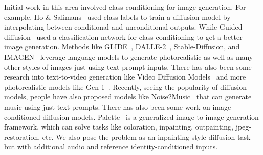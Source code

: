 Initial work in this area involved class conditioning for image generation. For example, Ho \& Salimans~\cite{ho2021classifierfree} used class labels to train a diffusion model by interpolating between conditional and unconditional outputs. While Guided-diffusion~\cite{guided-diffusion} used a classification network for class conditioning to get a better image generation. Methods like GLIDE~\cite{glide}, DALLE-2~\cite{dalle2}, Stable-Diffusion\cite{latent-diffusion}, and IMAGEN~\cite{imagen} leverage language models to generate photorealistic as well as many other styles of images just using text prompt inputs. There has also been some research into text-to-video generation like Video Diffusion Models~\cite{video-diffusion-models} and more photorealistic models like Gen-1~\cite{gen1}. Recently, seeing the popularity of diffusion models, people have also proposed models like Noise2Music~\cite{noise2music} that can generate music using just text prompts. There has also been some work on image-conditioned diffusion models. Palette~\cite{palette} is a generalized image-to-image generation framework, which can solve tasks like coloration, inpainting, outpainting, jpeg-restoration, etc. We also pose the problem as an inpainting style diffusion task but with additional audio and reference identity-conditioned inputs. 

  



